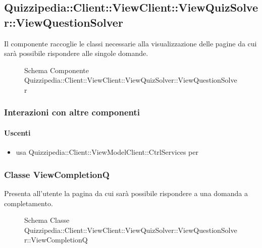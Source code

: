 \subsection{Quizzipedia::Client::ViewClient::ViewQuizSolver::ViewQuestionSolver}
Il componente raccoglie le classi necessarie alla visualizzazione delle pagine da cui sarà possibile rispondere alle singole domande.
\begin{figure}[H]
\centering
\noindent{}
\caption[Schema Componente Quizzipedia::Client::ViewClient::ViewQuizSolver::ViewQuestionSolver]{Schema Componente Quizzipedia::Client::ViewClient::ViewQuizSolver::ViewQuestionSolver}
\end{figure}
\subsubsection{Interazioni con altre componenti}
\paragraph{Uscenti}
\begin{itemize}
\item usa Quizzipedia::Client::ViewModelClient::CtrlServices per 
\end{itemize}
\subsubsection{Classe ViewCompletionQ}
Presenta all'utente la pagina da cui sarà possibile rispondere a una domanda a completamento.
\begin{figure}[H]
\centering
\noindent{}
\caption[Schema Classe ViewCompletionQ]{Schema Classe Quizzipedia::Client::ViewClient::ViewQuizSolver::ViewQuestionSolver::ViewCompletionQ}
\end{figure}
